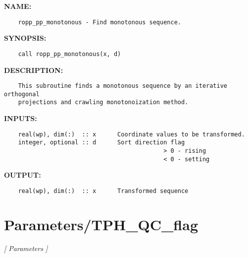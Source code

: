 \label{ch:robo50}
\label{ch:Monotonous_ropp_pp_monotonous}
\textbf{NAME:}\hspace{0.08in}\begin{Verbatim}
    ropp_pp_monotonous - Find monotonous sequence.
\end{Verbatim}
\textbf{SYNOPSIS:}\hspace{0.08in}\begin{Verbatim}
    call ropp_pp_monotonous(x, d)
\end{Verbatim}
\textbf{DESCRIPTION:}\hspace{0.08in}\begin{Verbatim}
    This subroutine finds a monotonous sequence by an iterative orthogonal
    projections and crawling monotonoization method.
\end{Verbatim}
\textbf{INPUTS:}\hspace{0.08in}\begin{Verbatim}
    real(wp), dim(:)  :: x      Coordinate values to be transformed.
    integer, optional :: d      Sort direction flag 
                                             > 0 - rising
                                             < 0 - setting
\end{Verbatim}
\textbf{OUTPUT:}\hspace{0.08in}\begin{Verbatim}
    real(wp), dim(:)  :: x      Transformed sequence
\end{Verbatim}
\section{Parameters/TPH\_QC\_flag}
\textsl{[ Parameters ]}


